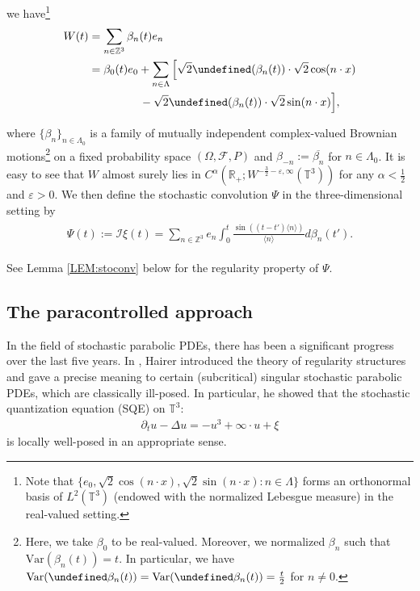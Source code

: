 \documentclass[%
11pt,  reqno]{amsart}
\newcommand{\1}{\hspace{0.2mm}\text{I}\hspace{0.2mm}}
\newcommand{\noi}{\noindent}
\newcommand{\Z}{\mathbb{Z}}
\newcommand{\R}{\mathbb{R}}
\newcommand{\T}{\mathbb{T}}
\let\Re=\undefined\DeclareMathOperator*{\Re}{Re}
\let\Im=\undefined\DeclareMathOperator*{\Im}{Im}
\newcommand{\F}{\mathcal{F}}
\newcommand{\al}{\alpha}
\newcommand{\be}{\beta}
\newcommand{\Dl}{\Delta}
\newcommand{\eps}{\varepsilon}
\newcommand{\Ld}{\Lambda}
\newcommand{\cj}{\overline}
\newcommand{\dt}{\partial_t}
\renewcommand{\O}{\Omega}
\newcommand{\jb}[1]
{\langle #1 \rangle}
\newcommand{\I}{\mathcal{I}}
\numberwithin{equation}{section}
\numberwithin{theorem}{section}
\begin{document}
\noi
we have\footnote{Note that $\{e_0, \sqrt 2\cos( n\cdot x), 
\sqrt 2 \sin ( n \cdot x):
n \in \Ld \}$ forms an orthonormal basis of $L^2(\T^3)$ 
(endowed with the normalized Lebesgue measure) in the real-valued setting.}
\begin{align}
\begin{split}
 W(t) & =  \sum_{n\in \Z^3}
\be_n (t) e_n \\
& = \be_0(t) e_0 +  \sum_{n\in \Ld}
\Big[\sqrt 2 \Re(\be_n (t)) \cdot  \sqrt 2 \cos ( n \cdot x)\\
& \hphantom{XXXXX}
- \sqrt 2\Im(\be_n (t) )\cdot \sqrt 2 \sin ( n \cdot x)\Big],
\end{split}
\label{Wiener1}
\end{align}


\noi
where $\{ \be_n\}_{n \in \Ld_0}$ is a family of  mutually independent 
 complex-valued Brownian
motions\footnote{Here, we take $\be_0$ to be real-valued.
Moreover, we normalized $\be_n$ such that 
$\text{Var}(\be_n(t)) = t$. In particular, we have 
$\text{Var}(\Re \be_n(t)) = \text{Var}(\Im \be_n(t)) = \frac{t}{2}$
for $n \ne 0$.}
on a fixed probability space $(\O, \F, P)$
and $\be_{-n} := \cj{\be_n}$ for $n \in \Ld_0$.
It is easy to see that $W$ almost surely lies in 
$C^{\al}(\R_+;W^{-\frac{3}{2}-\eps, \infty}(\T^3))$
for any $\al < \frac 12$ and $\eps > 0$.
We then define the  stochastic convolution $\Psi$  
in the three-dimensional setting by 
\begin{align}
\begin{split}
\Psi(t) := 
\I \xi (t) = \sum_{n \in \mathbb{Z}^3} e_n 
   \int_0^t \frac{\sin ((t - t') \jb{ n })}{\jb{ n }} d \beta_n (t'). 
\end{split}
\label{sconv1}
\end{align}


\noi
See Lemma \ref{LEM:stoconv} below
for the regularity property of $\Psi$.





\subsection{The paracontrolled approach}
In the field of stochastic parabolic PDEs, 
there has been a significant progress
over the last five years.
In \cite{Hairer}, Hairer introduced the theory of regularity structures
and gave a precise meaning to 
certain (subcritical) singular stochastic parabolic PDEs,
which are classically ill-posed.
In particular, he showed that the stochastic quantization equation (SQE) on $\T^3$:
\begin{align}
\dt u -  \Dl u  = - u^3 + \infty \cdot u  + \xi
\label{SQE1}
\end{align}
\noi
is locally well-posed in an appropriate sense.
\end{document}
